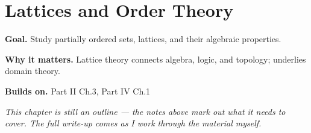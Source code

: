 \chapter{Lattices and Order Theory}
\label{ch:04-abstract-algebra-08}

\begin{chapterintro}
\textbf{Goal.} Study partially ordered sets, lattices, and their algebraic properties.

\textbf{Why it matters.} Lattice theory connects algebra, logic, and topology; underlies domain theory.

\textbf{Builds on.} Part II Ch.3, Part IV Ch.1
\end{chapterintro}

\textit{This chapter is still an outline --- the notes above mark out what it needs to cover. The full write-up comes as I work through the material myself.}
